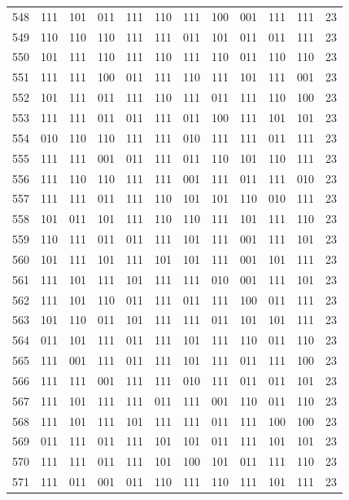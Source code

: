 \begin{longtable}{r*{10}{c}r}
548 & 111 & 101 & 011 & 111 & 110 & 111 & 100 & 001 & 111 & 111 & 23\\
549 & 110 & 110 & 110 & 111 & 111 & 011 & 101 & 011 & 011 & 111 & 23\\
550 & 101 & 111 & 110 & 111 & 110 & 111 & 110 & 011 & 110 & 110 & 23\\
551 & 111 & 111 & 100 & 011 & 111 & 110 & 111 & 101 & 111 & 001 & 23\\
552 & 101 & 111 & 011 & 111 & 110 & 111 & 011 & 111 & 110 & 100 & 23\\
553 & 111 & 111 & 011 & 011 & 111 & 011 & 100 & 111 & 101 & 101 & 23\\
554 & 010 & 110 & 110 & 111 & 111 & 010 & 111 & 111 & 011 & 111 & 23\\
555 & 111 & 111 & 001 & 011 & 111 & 011 & 110 & 101 & 110 & 111 & 23\\
556 & 111 & 110 & 110 & 111 & 111 & 001 & 111 & 011 & 111 & 010 & 23\\
557 & 111 & 111 & 011 & 111 & 110 & 101 & 101 & 110 & 010 & 111 & 23\\
558 & 101 & 011 & 101 & 111 & 110 & 110 & 111 & 101 & 111 & 110 & 23\\
559 & 110 & 111 & 011 & 011 & 111 & 101 & 111 & 001 & 111 & 101 & 23\\
560 & 101 & 111 & 101 & 111 & 101 & 101 & 111 & 001 & 101 & 111 & 23\\
561 & 111 & 101 & 111 & 101 & 111 & 111 & 010 & 001 & 111 & 101 & 23\\
562 & 111 & 101 & 110 & 011 & 111 & 011 & 111 & 100 & 011 & 111 & 23\\
563 & 101 & 110 & 011 & 101 & 111 & 111 & 011 & 101 & 101 & 111 & 23\\
564 & 011 & 101 & 111 & 011 & 111 & 101 & 111 & 110 & 011 & 110 & 23\\
565 & 111 & 001 & 111 & 011 & 111 & 101 & 111 & 011 & 111 & 100 & 23\\
566 & 111 & 111 & 001 & 111 & 111 & 010 & 111 & 011 & 011 & 101 & 23\\
567 & 111 & 101 & 111 & 111 & 011 & 111 & 001 & 110 & 011 & 110 & 23\\
568 & 111 & 101 & 111 & 101 & 111 & 111 & 011 & 111 & 100 & 100 & 23\\
569 & 011 & 111 & 011 & 111 & 101 & 101 & 011 & 111 & 101 & 101 & 23\\
570 & 111 & 111 & 011 & 111 & 101 & 100 & 101 & 011 & 111 & 110 & 23\\
571 & 111 & 011 & 001 & 011 & 110 & 111 & 110 & 111 & 101 & 111 & 23\\

\end{longtable}
